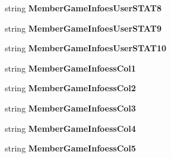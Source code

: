 \begin{DoxyCompactItemize}
\item 
string {\bfseries Member\+Game\+Infoes\+User\+S\+T\+A\+T8}\hypertarget{a00115_a294306431c5506fd17a062b06d8d2416}{}\label{a00115_a294306431c5506fd17a062b06d8d2416}

\item 
string {\bfseries Member\+Game\+Infoes\+User\+S\+T\+A\+T9}\hypertarget{a00115_ab2961e23a9c4a7d921d46944f557901f}{}\label{a00115_ab2961e23a9c4a7d921d46944f557901f}

\item 
string {\bfseries Member\+Game\+Infoes\+User\+S\+T\+A\+T10}\hypertarget{a00115_a4b5261ac39710cb715a2a32dec2e6d8e}{}\label{a00115_a4b5261ac39710cb715a2a32dec2e6d8e}

\item 
string {\bfseries Member\+Game\+Infoess\+Col1}\hypertarget{a00115_a2a1845610b16557c40b1c8ce36293349}{}\label{a00115_a2a1845610b16557c40b1c8ce36293349}

\item 
string {\bfseries Member\+Game\+Infoess\+Col2}\hypertarget{a00115_a1f7aa197fa45eac21b11aac41bd44aef}{}\label{a00115_a1f7aa197fa45eac21b11aac41bd44aef}

\item 
string {\bfseries Member\+Game\+Infoess\+Col3}\hypertarget{a00115_a9720573c3d12bf6ed914f8daacb7f53c}{}\label{a00115_a9720573c3d12bf6ed914f8daacb7f53c}

\item 
string {\bfseries Member\+Game\+Infoess\+Col4}\hypertarget{a00115_a2a200b735f929e0e22f80feb754624d7}{}\label{a00115_a2a200b735f929e0e22f80feb754624d7}

\item 
string {\bfseries Member\+Game\+Infoess\+Col5}\hypertarget{a00115_a0a920052475e7c1102d90c66c6fbd243}{}\label{a00115_a0a920052475e7c1102d90c66c6fbd243}


\end{DoxyCompactItemize}
